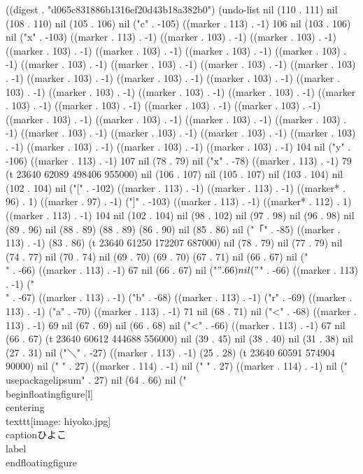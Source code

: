 
((digest . "d065c831886b1316ef20d43b18a382b0") (undo-list nil (110 . 111) nil (108 . 110) nil (105 . 106) nil ("c" . -105) ((marker . 113) . -1) 106 nil (103 . 106) nil ("x" . -103) ((marker . 113) . -1) ((marker . 103) . -1) ((marker . 103) . -1) ((marker . 103) . -1) ((marker . 103) . -1) ((marker . 103) . -1) ((marker . 103) . -1) ((marker . 103) . -1) ((marker . 103) . -1) ((marker . 103) . -1) ((marker . 103) . -1) ((marker . 103) . -1) ((marker . 103) . -1) ((marker . 103) . -1) ((marker . 103) . -1) ((marker . 103) . -1) ((marker . 103) . -1) ((marker . 103) . -1) ((marker . 103) . -1) ((marker . 103) . -1) ((marker . 103) . -1) ((marker . 103) . -1) ((marker . 103) . -1) ((marker . 103) . -1) ((marker . 103) . -1) ((marker . 103) . -1) ((marker . 103) . -1) ((marker . 103) . -1) ((marker . 103) . -1) ((marker . 103) . -1) ((marker . 103) . -1) ((marker . 103) . -1) ((marker . 103) . -1) 104 nil ("y" . -106) ((marker . 113) . -1) 107 nil (78 . 79) nil ("x" . -78) ((marker . 113) . -1) 79 (t 23640 62089 498406 955000) nil (106 . 107) nil (105 . 107) nil (103 . 104) nil (102 . 104) nil ("[" . -102) ((marker . 113) . -1) ((marker . 113) . -1) ((marker* . 96) . 1) ((marker . 97) . -1) ("]" . -103) ((marker . 113) . -1) ((marker* . 112) . 1) ((marker . 113) . -1) 104 nil (102 . 104) nil (98 . 102) nil (97 . 98) nil (96 . 98) nil (89 . 96) nil (88 . 89) (88 . 89) (86 . 90) nil (85 . 86) nil ("「" . -85) ((marker . 113) . -1) (83 . 86) (t 23640 61250 172207 687000) nil (78 . 79) nil (77 . 79) nil (74 . 77) nil (70 . 74) nil (69 . 70) (69 . 70) (67 . 71) nil (66 . 67) nil ("\\" . -66) ((marker . 113) . -1) 67 nil (66 . 67) nil ("$" . 66) nil ("$" . -66) ((marker . 113) . -1) ("\\" . -67) ((marker . 113) . -1) ("b" . -68) ((marker . 113) . -1) ("r" . -69) ((marker . 113) . -1) ("a" . -70) ((marker . 113) . -1) 71 nil (68 . 71) nil ("<" . -68) ((marker . 113) . -1) 69 nil (67 . 69) nil (66 . 68) nil ("<" . -66) ((marker . 113) . -1) 67 nil (66 . 67) (t 23640 60612 444688 556000) nil (39 . 45) nil (38 . 40) nil (31 . 38) nil (27 . 31) nil ("＼" . -27) ((marker . 113) . -1) (25 . 28) (t 23640 60591 574904 90000) nil ("
" . 27) ((marker . 114) . -1) nil ("
" . 27) ((marker . 114) . -1) nil ("\\usepackage{lipsum}" . 27) nil (64 . 66) nil ("
\\begin{floatingfigure}[l]{5cm}
 \\centering
 \\texttt{[image: hiyoko.jpg]}
 \\caption{ひよこ}
 \\label{}
\\end{floatingfigure}

